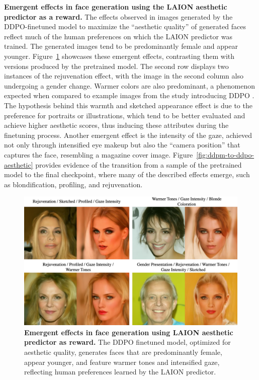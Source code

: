 \noindent \textbf{Emergent effects in face generation using the LAION aesthetic predictor as a reward.} The effects observed in images generated by the DDPO-finetuned model to maximize the ``aesthetic quality'' of generated faces reflect much of the human preferences on which the LAION predictor was trained. The generated images tend to be predominantly female and appear younger. Figure~\ref{fig:aesthetic-effects} showcases these emergent effects, contrasting them with versions produced by the pretrained model. The second row displays two instances of the rejuvenation effect, with the image in the second column also undergoing a gender change. Warmer colors are also predominant, a phenomenon expected when compared to example images from the study introducing DDPO \cite{black2023training}. The hypothesis behind this warmth and sketched appearance effect is due to the preference for portraits or illustrations, which tend to be better evaluated and achieve higher aesthetic scores, thus inducing these attributes during the finetuning process. Another emergent effect is the intensity of the gaze, achieved not only through intensified eye makeup but also the ``camera position'' that captures the face, resembling a magazine cover image. Figure~\ref{fig:ddpm-to-ddpo-aesthetic} provides evidence of the transition from a sample of the pretrained model to the final checkpoint, where many of the described effects emerge, such as blondification, profiling, and rejuvenation. \\

\begin{figure}[ht]
  \centering
  \includegraphics[scale=0.85]{img/results/aesthetic-effects.png}
  \vspace{-0pt}  %
    \captionsetup{width=\textwidth} %
    \caption{\textbf{Emergent effects in face generation using LAION aesthetic predictor as reward.} The DDPO finetuned model, optimized for aesthetic quality, generates faces that are predominantly female, appear younger, and feature warmer tones and intensified gaze, reflecting human preferences learned by the LAION predictor. }
    \label{fig:aesthetic-effects}
\end{figure}

